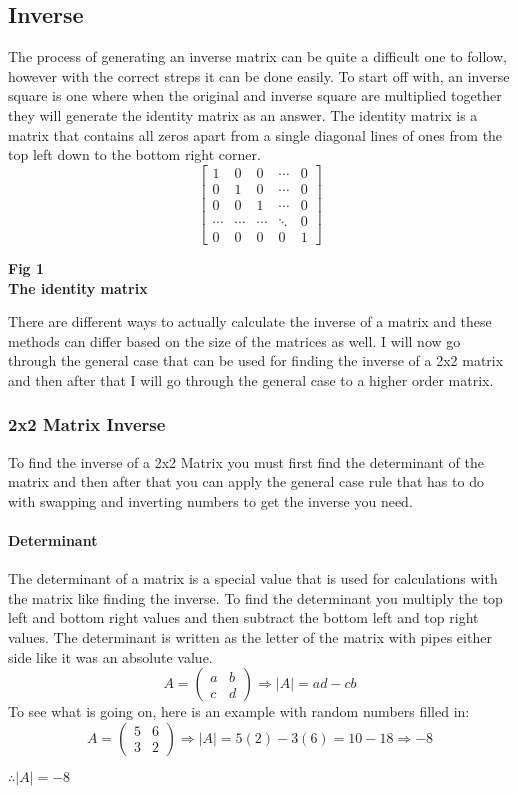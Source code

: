 \documentclass{article}
\begin{document}
\subsection{Inverse}
The process of generating an inverse matrix can be quite a difficult one to follow, however with the correct streps it can be done easily. To start off with, an inverse square is one where when the original and inverse square are multiplied together they will generate the identity matrix as an answer. The identity matrix is a matrix that contains all zeros apart from a single diagonal lines of ones from the top left down to the bottom right corner. 
\vspace{0.5cm}
	\[
	\begin{bmatrix}
		1 & 0 & 0 & \cdots & 0\\
		0 & 1 & 0 & \cdots & 0\\
		0 & 0 & 1 & \cdots & 0\\
		\cdots & \cdots & \cdots & \ddots & 0\\
		0 & 0 & 0 & 0 & 1
	\end{bmatrix}
	\]
	\begin{center}
		\small{ \textbf{Fig 1 \\ The identity matrix}}
	\end{center}

There are different ways to actually calculate the inverse of a matrix and these methods can differ based on the size of the matrices as well. I will now go through the general case that can be used for finding the inverse of a 2x2 matrix and then after that I will go through the general case to a higher order matrix.
\subsubsection{2x2 Matrix Inverse}
To find the inverse of a 2x2 Matrix you must first find the determinant of the matrix and then after that you can apply the general case rule that has to do with swapping and inverting numbers to get the inverse you need. 
\paragraph{Determinant}
The determinant of a matrix is a special value that is used for calculations with the matrix like finding the inverse. To find the determinant you multiply the top left and bottom right values and then subtract the bottom left and top right values. The determinant is written as the letter of the matrix with pipes either side like it was an absolute value.
\[
	A = 
	\begin{pmatrix}
		a & b\\
		c & d
	\end{pmatrix}
	\Rightarrow
	|A| = ad-cb	
\]
To see what is going on, here is an example with random numbers filled in:
\[
	A = 
	\begin{pmatrix}
		5 & 6\\
		3 & 2
	\end{pmatrix}
	\Rightarrow
	|A| = 5(2) - 3(6) = 10-18
	\Rightarrow
	-8
\]
\begin{center}\vspace{0.5cm}$\therefore |A| = -8$\end{center}
\end{document}
